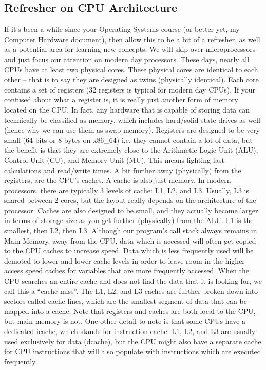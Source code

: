 \documentclass{article}
\begin{document}
\subsection{Refresher on CPU Architecture}

If it’s been a while since your Operating Systems course (or better yet, my Computer Hardware document), then
allow this to be a bit of a refresher, as well as a potential area for learning new concepts. We will skip
over microprocessors and just focus our attention on modern day processors. These days, nearly all CPUs have
at least two physical cores. These physical cores are identical to each other – that is to say they are
designed as twins (physically identical). Each core contains a set of registers (32 registers is typical for
modern day CPUs). If your confused about what a register is, it is really just another form of memory located
on the CPU. In fact, any hardware that is capable of storing data can technically be classified as memory,
which includes hard/solid state drives as well (hence why we can use them as swap memory). Registers are
designed to be very small (64 bits or 8 bytes on x86_64) i.e. they cannot contain a lot of data, but the
benefit is that they are extremely close to the Arithmetic Logic Unit (ALU), Control Unit (CU), and Memory
Unit (MU). This means lighting fast calculations and read/write times. A bit further away (physically) from
the registers, are the CPU’s caches. A cache is also just memory. In modern processors, there are typically
3 levels of cache: L1, L2, and L3. Usually, L3 is shared between 2 cores, but the layout really depends on
the architecture of the processor. Caches are also designed to be small, and they actually become larger in
terms of storage size as you get further (physically) from the ALU. L1 is the smallest, then L2, then L3.
Although our program’s call stack always remains in Main Memory, away from the CPU, data which is accessed
will often get copied to the CPU caches to increase speed. Data which is less frequently used will be demoted
to lower and lower cache levels in order to leave room in the higher access speed caches for variables that
are more frequently accessed. When the CPU searches an entire cache and does not find the data that it is
looking for, we call this a “cache miss”. The L1, L2, and L3 caches are further broken down into sectors
called cache lines, which are the smallest segment of data that can be mapped into a cache. Note that
registers and caches are both local to the CPU, but main memory is not. One other detail to note is that some
CPUs have a dedicated icache, which stands for instruction cache. L1, L2, and L3 are usually used exclusively
for data (dcache), but the CPU might also have a separate cache for CPU instructions that will also populate
with instructions which are executed frequently.
\end{document}

